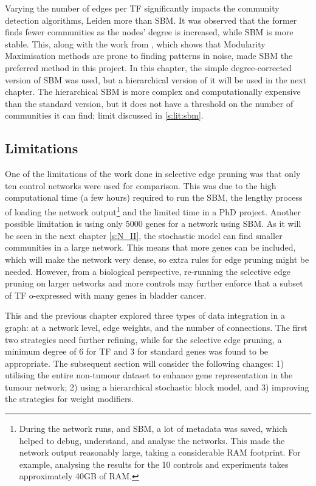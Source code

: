 Varying the number of edges per TF significantly impacts the community detection algorithms, Leiden more than SBM. It was observed that the former finds fewer communities as the nodes' degree is increased, while SBM is more stable. This, along with the work from \citet{Peixoto2023-se, Peixoto2023-rt}, which shows that Modularity Maximisation methods are prone to finding patterns in noise, made SBM the preferred method in this project. In this chapter, the simple degree-corrected version of SBM was used, but a hierarchical version of it will be used in the next chapter. The hierarchical SBM is more complex and computationally expensive than the standard version, but it does not have a threshold on the number of communities it can find; limit discussed in \cref{s:lit:sbm}.


\subsection* {Limitations}

One of the limitations of the work done in selective edge pruning was that only ten control networks were used for comparison. This was due to the high computational time (a few hours) required to run the SBM, the lengthy process of loading the network output\footnote{During the network runs, and SBM, a lot of metadata was saved, which helped to debug, understand, and analyse the networks. This made the network output reasonably large, taking a considerable RAM footprint. For example, analysing the results for the 10 controls and experiments takes approximately 40GB of RAM.} and the limited time in a PhD project. Another possible limitation is using only 5000 genes for a network using SBM. As it will be seen in the next chapter \cref{s:N_II}, the stochastic model can find smaller communities in a large network. This means that more genes can be included, which will make the network very dense, so extra rules for edge pruning might be needed. However, from a biological perspective, re-running the selective edge pruning on larger networks and more controls may further enforce that a subset of TF o-expressed with many genes in bladder cancer.


This and the previous chapter explored three types of data integration in a graph: at a network level, edge weights, and the number of connections. The first two strategies need further refining, while for the selective edge pruning, a minimum degree of 6 for TF and 3 for standard genes was found to be appropriate. The subsequent section will consider the following changes:  1) utilising the entire non-tumour dataset to enhance gene representation in the tumour network; 2) using a hierarchical stochastic block model, and 3) improving the strategies for weight modifiers.


